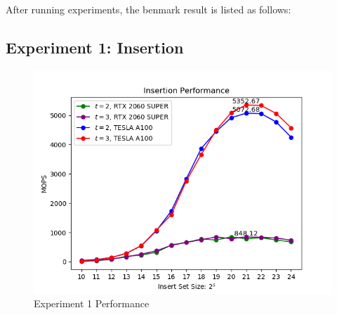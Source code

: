\documentclass[10pt,twocolumn,letterpaper]{article}
\begin{document}
After running experiments, the benmark result is listed as follows:

\subsection{Experiment 1: Insertion}

\begin{figure}[h]
    \centering
    \includegraphics[scale=0.5]{figures/1.png}
    \caption{Experiment 1 Performance}
    \label{fig:experiment1}
\end{figure}
\end{document}
